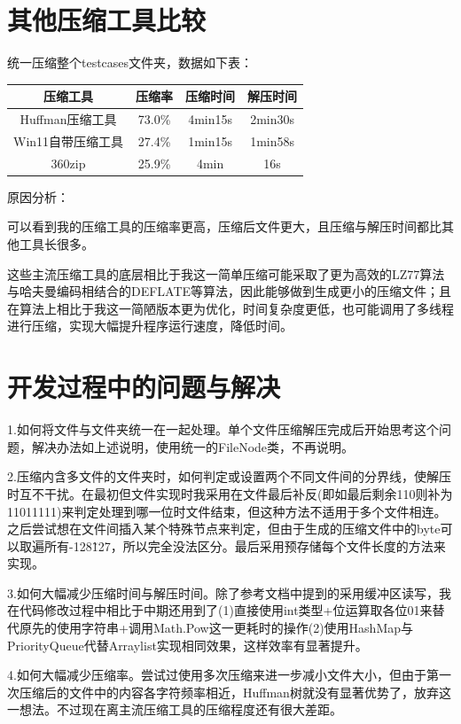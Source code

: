 \documentclass[11pt,a4paper]{article}
\begin{document}
\section{其他压缩工具比较}
\par{统一压缩整个testcases文件夹，数据如下表：}
\begin{table}[h!]
    \begin{center}
        \begin{tabular}{|c|c|c|c|}
            \hline
            压缩工具          & 压缩率 & 压缩时间 & 解压时间 \\
            \hline
            Huffman压缩工具   & 73.0\% & 4min15s  & 2min30s  \\
            Win11自带压缩工具 & 27.4\% & 1min15s  & 1min58s  \\
            360zip            & 25.9\% & 4min     & 16s      \\
            \hline
        \end{tabular}
    \end{center}
\end{table}
\par{原因分析：}
\par{可以看到我的压缩工具的压缩率更高，压缩后文件更大，且压缩与解压时间都比其他工具长很多。}
\par{这些主流压缩工具的底层相比于我这一简单压缩可能采取了更为高效的LZ77算法与哈夫曼编码相结合的DEFLATE等算法，因此能够做到生成更小的压缩文件；且在算法上相比于我这一简陋版本更为优化，时间复杂度更低，也可能调用了多线程进行压缩，实现大幅提升程序运行速度，降低时间。}
\section{开发过程中的问题与解决}
\par{1.如何将文件与文件夹统一在一起处理。单个文件压缩解压完成后开始思考这个问题，解决办法如上述说明，使用统一的FileNode类，不再说明。}
\par{2.压缩内含多文件的文件夹时，如何判定或设置两个不同文件间的分界线，使解压时互不干扰。在最初但文件实现时我采用在文件最后补反(即如最后剩余110则补为11011111)来判定处理到哪一位时文件结束，但这种方法不适用于多个文件相连。之后尝试想在文件间插入某个特殊节点来判定，但由于生成的压缩文件中的byte可以取遍所有-128\~127，所以完全没法区分。最后采用预存储每个文件长度的方法来实现。}
\par{3.如何大幅减少压缩时间与解压时间。除了参考文档中提到的采用缓冲区读写，我在代码修改过程中相比于中期还用到了(1)直接使用int类型+位运算取各位01来替代原先的使用字符串+调用Math.Pow这一更耗时的操作(2)使用HashMap与PriorityQueue代替Arraylist实现相同效果，这样效率有显著提升。}
\par{4.如何大幅减少压缩率。尝试过使用多次压缩来进一步减小文件大小，但由于第一次压缩后的文件中的内容各字符频率相近，Huffman树就没有显著优势了，放弃这一想法。不过现在离主流压缩工具的压缩程度还有很大差距。}
\end{document}
